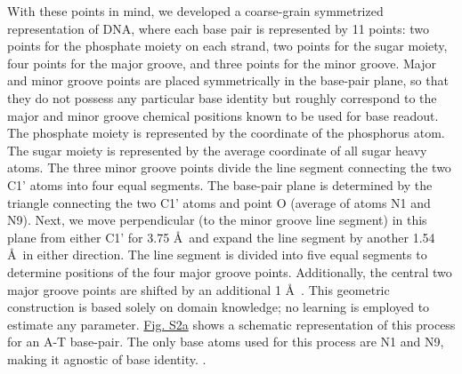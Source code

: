 With these points in mind, we developed a coarse-grain symmetrized representation of DNA, where each base pair is represented by 11 points: two points for the phosphate moiety on each strand, two points for the sugar moiety, four points for the major groove, and three points for the minor groove. Major and minor groove points are placed symmetrically in the base-pair plane, so that they do not possess any particular base identity but roughly correspond to the major and minor groove chemical positions known \citep{Chiu2023} to be used for base readout. The phosphate moiety is represented by the coordinate of the phosphorus atom. The sugar moiety is represented by the average coordinate of all sugar heavy atoms. The three minor groove points divide the line segment connecting the two C1' atoms into four equal segments. The base-pair plane is determined by the triangle connecting the two C1' atoms and point O (average of atoms N1 and N9). Next, we move perpendicular (to the minor groove line segment) in this plane from either C1' for 3.75 \AA\  and expand the line segment by another 1.54 \AA\  in either direction. The line segment is divided into five equal segments to determine positions of the four major groove points. Additionally, the central two major groove points are shifted by an additional 1 \AA\ . This geometric construction is based solely on domain knowledge; no learning is employed to estimate any parameter. \hyperref[fig:pdnaS2]{Fig. S2a} shows a schematic representation of this process for an A-T base-pair. The only base atoms used for this process are N1 and N9, making it agnostic of base identity. .

